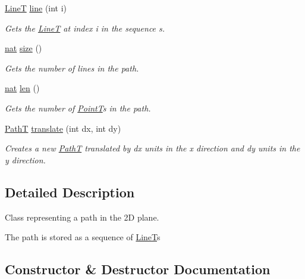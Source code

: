 \begin{DoxyCompactItemize}
\mbox{\hyperlink{class_line_t}{LineT}} \mbox{\hyperlink{class_path_t_ac9898c0a98d32ffeaa2d5dcd20699e4d}{line}} (int i)
\begin{DoxyCompactList}\small\item\em Gets the \mbox{\hyperlink{class_line_t}{LineT}} at index i in the sequence s. \end{DoxyCompactList}\item 
\mbox{\hyperlink{_path_a_d_t_8h_a56638ee9d162e8cce3a15f92d2023d6e}{nat}} \mbox{\hyperlink{class_path_t_a6899210e56f6d080949878a1d1b3c361}{size}} ()
\begin{DoxyCompactList}\small\item\em Gets the number of lines in the path. \end{DoxyCompactList}\item 
\mbox{\hyperlink{_path_a_d_t_8h_a56638ee9d162e8cce3a15f92d2023d6e}{nat}} \mbox{\hyperlink{class_path_t_aacb8d7cde9698022b8c49c8d5cc94f5e}{len}} ()
\begin{DoxyCompactList}\small\item\em Gets the number of \mbox{\hyperlink{class_point_t}{PointT}}\textquotesingle{}s in the path. \end{DoxyCompactList}\item 
\mbox{\hyperlink{class_path_t}{PathT}} \mbox{\hyperlink{class_path_t_a4fad10e40e0a0da2b5343b6105f5d9c7}{translate}} (int dx, int dy)
\begin{DoxyCompactList}\small\item\em Creates a new \mbox{\hyperlink{class_path_t}{PathT}} translated by dx units in the x direction and dy units in the y direction. \end{DoxyCompactList}\end{DoxyCompactItemize}


\subsection{Detailed Description}
Class representing a path in the 2D plane. 

The path is stored as a sequence of \mbox{\hyperlink{class_line_t}{LineT}}\textquotesingle{}s 

\subsection{Constructor \& Destructor Documentation}
\mbox{\label{class_path_t_af4d989217199e7e981bd939925a28243}} 
